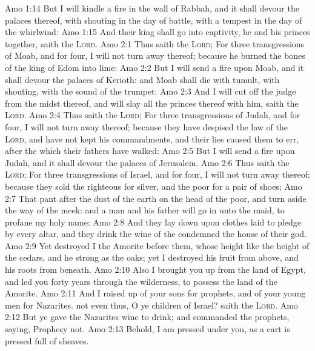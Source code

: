 \vs Amo 1:14 But I will kindle a fire in the wall of Rabbah, and it shall devour the palaces thereof, with shouting in the day of battle, with a tempest in the day of the whirlwind:
\vs Amo 1:15 And their king shall go into captivity, he and his princes together, saith the \textsc{Lord}.
\vs Amo 2:1 Thus saith the \textsc{Lord}; For three transgressions of Moab, and for four, I will not turn away  thereof; because he burned the bones of the king of Edom into lime:
\vs Amo 2:2 But I will send a fire upon Moab, and it shall devour the palaces of Kerioth: and Moab shall die with tumult, with shouting,  with the sound of the trumpet:
\vs Amo 2:3 And I will cut off the judge from the midst thereof, and will slay all the princes thereof with him, saith the \textsc{Lord}.
\vs Amo 2:4 Thus saith the \textsc{Lord}; For three transgressions of Judah, and for four, I will not turn away  thereof; because they have despised the law of the \textsc{Lord}, and have not kept his commandments, and their lies caused them to err, after the which their fathers have walked:
\vs Amo 2:5 But I will send a fire upon Judah, and it shall devour the palaces of Jerusalem.
\vs Amo 2:6 Thus saith the \textsc{Lord}; For three transgressions of Israel, and for four, I will not turn away  thereof; because they sold the righteous for silver, and the poor for a pair of shoes;
\vs Amo 2:7 That pant after the dust of the earth on the head of the poor, and turn aside the way of the meek: and a man and his father will go in unto the  maid, to profane my holy name:
\vs Amo 2:8 And they lay  down upon clothes laid to pledge by every altar, and they drink the wine of the condemned  the house of their god.
\vs Amo 2:9 Yet destroyed I the Amorite before them, whose height  like the height of the cedars, and he  strong as the oaks; yet I destroyed his fruit from above, and his roots from beneath.
\vs Amo 2:10 Also I brought you up from the land of Egypt, and led you forty years through the wilderness, to possess the land of the Amorite.
\vs Amo 2:11 And I raised up of your sons for prophets, and of your young men for Nazarites.  not even thus, O ye children of Israel? saith the \textsc{Lord}.
\vs Amo 2:12 But ye gave the Nazarites wine to drink; and commanded the prophets, saying, Prophesy not.
\vs Amo 2:13 Behold, I am pressed under you, as a cart is pressed  full of sheaves.
